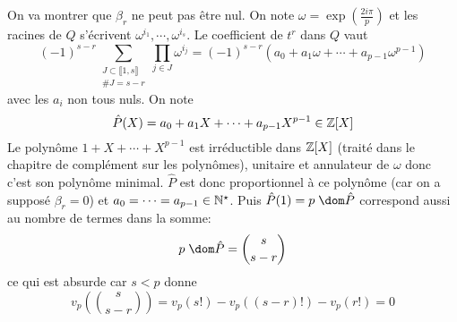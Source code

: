 \begin{itemize}
 On va montrer que  $\beta_r$ ne peut pas être nul. On note  $\omega=\exp (\frac{2i\pi }{p})$ et les racines de $Q$ s'écrivent  $\omega^{i_1},\cdots ,\omega^{i_s}$. Le coefficient de $t^r$ dans  $Q$ vaut  \[
     (-1)^{s-r}\sum_{\substack{J\subset \llbracket 1,s \rrbracket \\ \#J=s-r}}\prod_{j\in J}\omega^{i_j}=(-1)^{s-r}(a_0+a_1\omega+\cdots +a_{p-1}\omega^{p-1})
 \]
 avec les $a_i$ non tous nuls. On note \[
     \hat{P} (X)=a_0+a_1X+\cdots +a_{p-1}X^{p-1} \in \mathbb Z[X]
 \]
 Le polynôme $1+X+\cdots +X^{p-1}$ est irréductible dans $\mathbb Z[X]$ (traité dans le chapitre de complément sur les polynômes), unitaire et annulateur de $\omega$ donc c'est son polynôme minimal.  $\hat{P}$ est donc proportionnel à ce polynôme (car on a supposé $\beta_r=0$) et $a_0=\cdots =a_{p-1}\in  \mathbb N^\star$. Puis $\hat{P}(1)=p\;\dom \hat{P}$ correspond aussi au nombre de termes dans la somme: \[
     p\;\dom \hat{P}=\binom s{s-r}
 \] 
 ce qui est absurde car $s<p$ donne  \[
     v_p\left( \binom s{s-r} \right) =v_p(s!)-v_p((s-r)!)-v_p(r!)=0
 \] 
\end{itemize}

